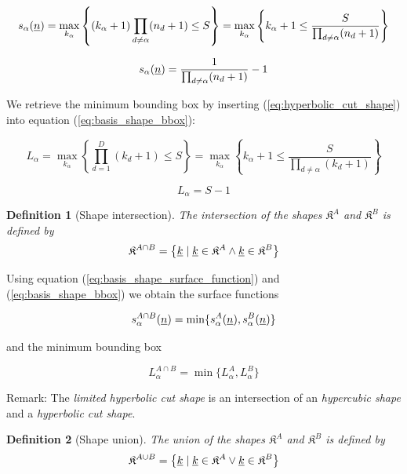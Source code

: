 \documentclass{article}
\newtheorem{definition}{Definition}
\begin{document}
\[
  s_{\alpha}(\underline{n})=
  \max_{k_{\alpha}}\left\{(k_{\alpha}+1)\prod_{d \neq \alpha} (n_d+1) \leq S \right\} =
  \max_{k_{\alpha}}\left\{k_{\alpha}+1 \leq \frac{S}{\prod_{d \neq \alpha}(n_d+1)}\right\}
\]

\begin{equation}
s_{\alpha}(\underline{n})=\frac{1}{\prod_{d \neq \alpha} (n_d+1)}-1
\end{equation}

We retrieve the minimum bounding box by inserting (\ref{eq:hyperbolic_cut_shape}) into
equation (\ref{eq:basis_shape_bbox}):

\[
  L_{\alpha}=\max_{k_{\alpha}}\left\{\prod_{d=1}^D(k_d+1) \leq S\right\} =
  \max_{k_{\alpha}}\left\{k_{\alpha}+1 \leq \frac{S}{\prod_{d \neq \alpha}(k_d+1)}\right\}
\]

\begin{equation}
L_{\alpha}=S-1
\end{equation}

\begin{definition}[Shape intersection]
  The intersection of the shapes \(\mathfrak{K}^{A}\) and \(\mathfrak{K}^{B}\) is defined by
  \begin{equation}
    \label{eq:basis_shape_intersection}
    \mathfrak{K}^{A \cap B}=\left\{\underline{k} \;|\; \underline{k} \in \mathfrak{K}^A \land
      \underline{k} \in \mathfrak{K}^B
    \right\}
  \end{equation}
\end{definition}

Using equation (\ref{eq:basis_shape_surface_function}) and (\ref{eq:basis_shape_bbox})
we obtain the surface functions

\begin{equation}
  s_{\alpha}^{A \cap B}(\underline{n}) = \min\{s_{\alpha}^A(\underline{n}), s_{\alpha}^B(\underline{n})\}
\end{equation}

and the minimum bounding box

\begin{equation}
  L_{\alpha}^{A \cap B} = \min\{L_{\alpha}^{A}, L_{\alpha}^{B}\}
\end{equation}

Remark: The \emph{limited hyperbolic cut shape} is an intersection of an
\emph{hypercubic shape} and a \emph{hyperbolic cut shape}.

\begin{definition}[Shape union]
  The union of the shapes \(\mathfrak{K}^{A}\) and \(\mathfrak{K}^{B}\) is defined by
  \begin{equation}
    \label{eq:basis_shape_union}
    \mathfrak{K}^{A \cup B}=\left\{\underline{k} \;|\; \underline{k} \in \mathfrak{K}^A \lor
      \underline{k} \in \mathfrak{K}^B
    \right\}
  \end{equation}
\end{definition}
\end{document}
